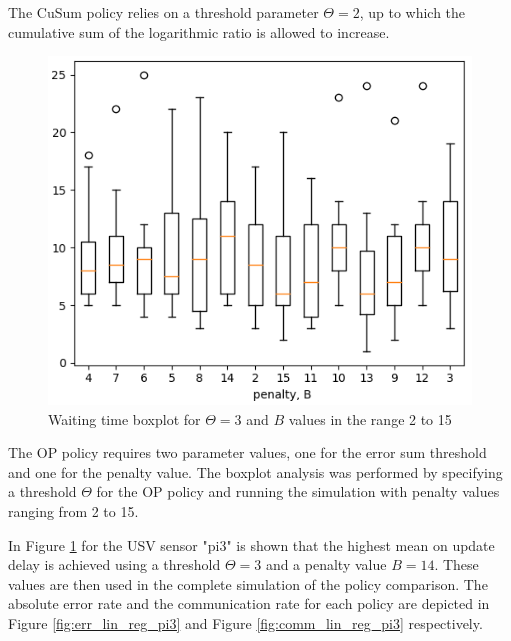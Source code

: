 \documentclass{mpaper}
\begin{document}
The CuSum policy relies on a threshold parameter $\Theta = 2$, up to which the cumulative sum of the logarithmic ratio is allowed to increase.

\begin{figure}[h]
    \centering
    \includegraphics[scale=0.4]{imgs/boxplot_linreg_waiting_pi3.png}
    \caption{Waiting time boxplot for $\Theta=3$ and $B$ values in the range 2 to 15}
    \label{fig:boxplot_linreg}
\end{figure}

The OP policy requires two parameter values, one for the error sum threshold and one for the penalty value. The boxplot analysis was performed by specifying a threshold $\Theta$ for the OP policy and running the simulation with penalty values ranging from 2 to 15. 

In Figure \ref{fig:boxplot_linreg} for the USV sensor "pi3" is shown that the highest mean on update delay is achieved using a threshold $\Theta = 3$ and a penalty value $B=14$.
These values are then used in the complete simulation of the policy comparison. The absolute error rate and the communication rate for each policy are depicted in Figure \ref{fig:err_lin_reg_pi3} and Figure \ref{fig:comm_lin_reg_pi3} respectively.
\end{document}

